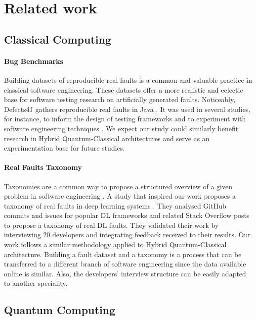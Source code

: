 \section{Related work}
\label{relatedwork}

\subsection{Classical Computing}
\paragraph{Bug Benchmarks} 
Building datasets of reproducible real faults is a common and valuable practice in classical software engineering. These datasets offer a more realistic and eclectic base for software testing research on artificially generated faults. Noticeably, Defects4J gathers reproducible real faults in Java \cite{just_defects4j_2014}. It was used in several studies, for instance, to inform the design of testing frameworks \cite{martinez_automatic_2017} and to experiment with software engineering techniques \cite{aleti_defects4j_2020}. We expect our study could similarly benefit research in Hybrid Quantum-Classical architectures and serve as an experimentation base for future studies. \\

\paragraph{Real Faults Taxonomy}
Taxonomies are a common way to propose a structured overview of a given problem in software engineering \cite{UsmanEtAl017}. A study that inspired our work proposes a taxonomy of real faults in deep learning systems \cite{humbatova_taxonomy_2019}. They analysed GitHub commits and issues for popular DL frameworks and related Stack Overflow posts to propose a taxonomy of real DL faults. They validated their work by interviewing 20 developers and integrating feedback received to their results. Our work follows a similar methodology applied to Hybrid Quantum-Classical architecture. Building a fault dataset and a taxonomy is a process that can be transferred to a different branch of software engineering since the data available online is similar. Also, the developers' interview structure can be easily adapted to another speciality. 

\subsection{Quantum Computing}
